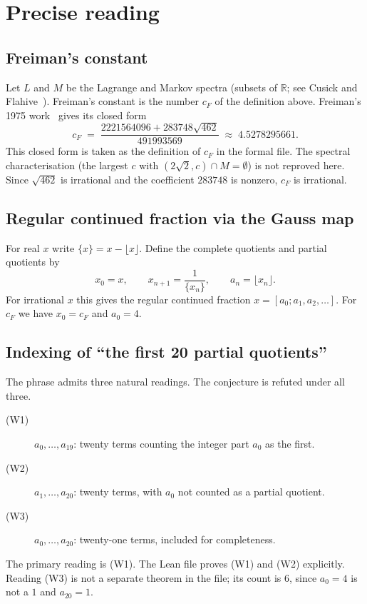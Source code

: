 \documentclass[11pt]{article}
\begin{document}
\section{Precise reading}

\subsection{Freiman's constant}

Let $L$ and $M$ be the Lagrange and Markov spectra (subsets of $\mathbb{R}$; see Cusick and
Flahive~\cite{CF}). Freiman's constant is the number $c_F$ of the definition above. Freiman's 1975
work~\cite{Fr} gives its closed form
\[
c_F \;=\; \frac{2221564096 + 283748\sqrt{462}}{491993569} \;\approx\; 4.5278295661.
\]
This closed form is taken as the definition of $c_F$ in the formal file. The spectral
characterisation (the largest $c$ with $(2\sqrt{2}, c) \cap M = \emptyset$) is not reproved here.
Since $\sqrt{462}$ is irrational and the coefficient $283748$ is nonzero, $c_F$ is irrational.

\subsection{Regular continued fraction via the Gauss map}

For real $x$ write $\{x\} = x - \lfloor x \rfloor$. Define the complete quotients and partial
quotients by
\[
x_0 = x, \qquad x_{n+1} = \frac{1}{\{x_n\}}, \qquad a_n = \lfloor x_n \rfloor .
\]
For irrational $x$ this gives the regular continued fraction $x = [a_0; a_1, a_2, \dots]$. For
$c_F$ we have $x_0 = c_F$ and $a_0 = 4$.

\subsection{Indexing of ``the first 20 partial quotients''}

The phrase admits three natural readings. The conjecture is refuted under all three.
\begin{description}
\item[(W1)] $a_0, \dots, a_{19}$: twenty terms counting the integer part $a_0$ as the first.
\item[(W2)] $a_1, \dots, a_{20}$: twenty terms, with $a_0$ not counted as a partial quotient.
\item[(W3)] $a_0, \dots, a_{20}$: twenty-one terms, included for completeness.
\end{description}
The primary reading is (W1). The Lean file proves (W1) and (W2) explicitly. Reading (W3) is not a separate theorem in the file; its count is $6$, since $a_0 = 4$ is not a $1$ and $a_{20} = 1$.
\end{document}
